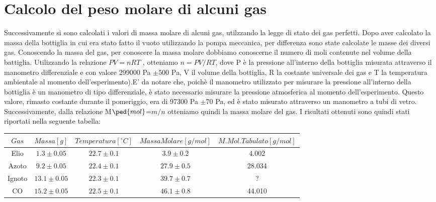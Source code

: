 \documentclass[a4paper,11pt]{article}
\begin{document}
\section{Calcolo del peso molare di alcuni gas}
Successivamente si sono calcolati i valori di massa molare di alcuni gas, utilzzando la legge di stato dei gas perfetti.
Dopo aver calcolato la massa della bottiglia in cui era stato fatto il vuoto utilizzando la pompa meccanica, per differenza sono state calcolate le masse dei diversi gas.
\newpage Conoscendo la massa del gas, per conoscere la massa molare dobbiamo conoscerne il numero di moli contenute nel volume della battiglia. Utilizzando la relazione $PV=nRT$ , otteniamo $n=PV/RT$, dove P è la pressione all'interno della bottiglia misurata attraverso il manometro differenziale e con valore 299000 Pa $\pm500$ Pa, V il volume della bottiglia, R la costante universale dei gas e T la temperatura ambientale al momento dell'esperimento).E' da notare che, poichè il manometro utilizzato per misurare la pressione all'interno della bottiglia è un manometro di tipo differenziale, è stato necessario misurare la pressione atmosferica al momento dell'esperimento. Questo valore, rimasto costante durante il pomeriggio, era di 97300 Pa $\pm70$ Pa, ed è stato misurato attraverso un manometro a tubi di vetro. Successivamente, dalla relazione M$\ped{mol}$=$m/n$ otteniamo quindi la massa molare del gas. I risultati ottenuti sono quindi stati riportati nella seguente tabella: 
\hspace{-140pt}

\begin{center}
\begin{tabular}{|c|c|c|c|c|}
\hline \rule[-2ex]{0pt}{5.5ex} $Gas$ & $Massa [g]$ & $Temperatura [^\circ{C}]$ & $Massa Molare [g/mol]$ & $M. Mol. Tabulato [g/mol]$ \\ 
\hline \rule[-2ex]{0pt}{5.5ex} Elio & $1.3 \pm 0.05$ & $22.7 \pm 0.1$ & $3.9 \pm 0.2$ & 4.002 \\ 
\hline \rule[-2ex]{0pt}{5.5ex} Azoto & $9.2 \pm 0.05$ & $22.4 \pm 0.1$ & $27.9 \pm 0.5$ & 28.034 \\ 
\hline \rule[-2ex]{0pt}{5.5ex} Ignoto & $13.1 \pm 0.05$ & $22.3 \pm 0.1$ & $39.7 \pm 0.7$ & ? \\ 
\hline \rule[-2ex]{0pt}{5.5ex} CO\ped2 & $15.2 \pm 0.05$ & $22.5 \pm 0.1$ & $46.1 \pm 0.8$ & 44.010 \\ 
\hline 
\end{tabular}
\end{center}
\vspace{40pt}
\end{document}
